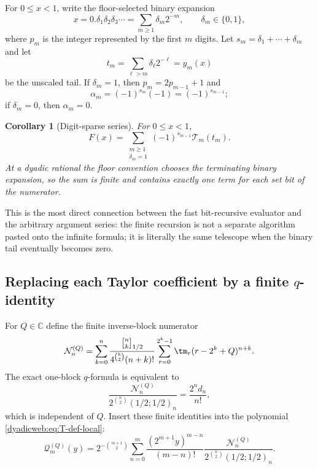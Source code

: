 \documentclass[11pt,oneside]{article}
\newtheorem{corollary}[theorem]{Corollary}
\theoremstyle{definition}
\theoremstyle{remark}
\newcommand{\C}{\mathbb C}
\newcommand{\qbinom}[3]{\genfrac{[}{]}{0pt}{}{#1}{#2}_{#3}}
\begin{document}
For $0\le x<1$, write the floor-selected binary expansion
\begin{equation}
 x=0.\delta_1\delta_2\delta_3\cdots
 =\sum_{m\ge1}\delta_m2^{-m},
 \qquad \delta_m\in\{0,1\},                               \label{dyadicweb:eq:binary-digits}
\end{equation}
where $p_m$ is the integer represented by the first $m$ digits.  Let
\(
 s_m=\delta_1+\cdots+\delta_m
\)
and let
\begin{equation}
 t_m=\sum_{\ell>m}\delta_\ell2^{-\ell}=y_m(x)             \label{dyadicweb:eq:binary-tail-digits}
\end{equation}
be the unscaled tail.  If $\delta_m=1$, then
$p_m=2p_{m-1}+1$ and
\[
 \alpha_m=(-1)^{s_m}(-1)=(-1)^{s_{m-1}};
\]
if $\delta_m=0$, then $\alpha_m=0$.

\begin{corollary}[Digit-sparse series]
\label{dyadicweb:cor:digit-sparse}
For $0\le x<1$,
\begin{equation}
 \boxed{
 F(x)=\sum_{\substack{m\ge1\\\delta_m=1}}
 (-1)^{s_{m-1}}\mathcal T_m(t_m).}                         \label{dyadicweb:eq:digit-sparse}
\end{equation}
At a dyadic rational the floor convention chooses the terminating binary expansion, so the
sum is finite and contains exactly one term for each set bit of the numerator.
\end{corollary}

This is the most direct connection between the fast bit-recursive evaluator and the arbitrary
argument series: the finite recursion is not a separate algorithm pasted onto the infinite
formula; it is literally the same telescope when the binary tail eventually becomes zero.

\subsection[Replacing each Taylor coefficient by a finite q-identity]{Replacing each Taylor coefficient by a finite $q$-identity}

For $Q\in\C$ define the finite inverse-block numerator
\begin{equation}
 \mathcal N_n^{(Q)}=
 \sum_{k=0}^{n}
 \frac{\qbinom nk{1/2}}{4^{\binom k2}(n+k)!}
 \sum_{r=0}^{2^k-1}\tm_r(r-2^k+Q)^{n+k}.                  \label{dyadicweb:eq:NnQ-local}
\end{equation}
The exact one-block $q$-formula is equivalent to
\begin{equation}
 \frac{\mathcal N_n^{(Q)}}
 {2^{\binom n2}(1/2;1/2)_n}
 =\frac{2^nd_n}{n!},                                      \label{dyadicweb:eq:NnQ-normalization-local}
\end{equation}
which is independent of $Q$.  Insert these finite identities into the polynomial
\eqref{dyadicweb:eq:T-def-local}:
\begin{equation}
 \mathcal Q_m^{(Q)}(y)=
 2^{-\binom{m+1}{2}}
 \sum_{n=0}^{m}
 \frac{(2^{m+1}y)^{m-n}}{(m-n)!}
 \frac{\mathcal N_n^{(Q)}}
 {2^{\binom n2}(1/2;1/2)_n}.                              \label{dyadicweb:eq:QmQ-local}
\end{equation}
\end{document}
